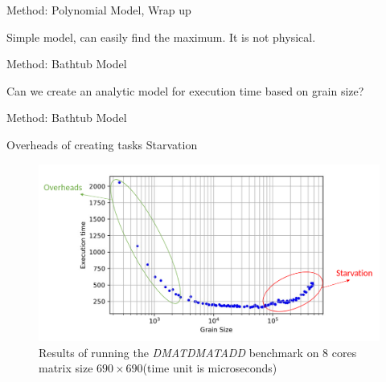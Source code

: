 \documentclass[10pt]{beamer}
\begin{document}
\begin{frame}{Method: Polynomial Model, Wrap up}
	\begin{outline}
		\1Simple model, can easily find the maximum.
		\1It is not physical.
	\end{outline}
\end{frame}

\begin{frame}{Method: Bathtub Model}
	\begin{outline}
		Can we create an analytic model for execution time based on grain size?
	\end{outline}
\end{frame}




\begin{frame}{Method: Bathtub Model}
	\begin{outline}		
		\1Overheads of creating tasks
		\1Starvation
		\begin{figure}
			
			\includegraphics[width=0.9\linewidth]{images/bathtub/all_690_4_star_over.png}	
			\caption{Results of running the \textit{DMATDMATADD} benchmark on $8$ cores matrix size $690\times690$(time unit is microseconds)}	
		\end{figure}
	\end{outline}
\end{frame}
\end{document}
